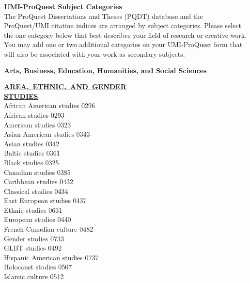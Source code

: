 \documentclass[9pt,twoside]{article}
\newcommand{\categoryheading}[1]{{\fontsize{8}{11}\selectfont \textbf{\uline{#1}}}}
\newcommand{\fieldheading}[1]{{\large \textbf{#1}}}
\begin{document}
\clearpage
{}
\raggedcolumns
\setlength{\parskip}{\baselineskip}
\fancyhf{}
\rfoot{\the\numexpr\thepage-1\relax}
{\large\textbf{UMI-ProQuest Subject Categories}} \\
The ProQuest Dissertations and Theses (PQDT) database and the ProQuest/UMI citation indices are arranged by subject categories. Please select
the one category below that best describes your field of research or creative work. You may add one or two additional categories on your UMI-ProQuest
form that will also be associated with your work as secondary subjects.

\fieldheading{Arts, Business, Education, Humanities, and Social Sciences}

\fontsize{8}{10}\selectfont
\setlength\columnsep{.6in}
\raggedright
\begin{multicols}{3}
\categoryheading{AREA,~ETHNIC,~AND~GENDER \\
STUDIES} \leavevmode \\
African American studies \hfill 0296 \leavevmode \\
African studies \hfill 0293 \leavevmode \\
American studies \hfill 0323 \leavevmode \\
Asian American studies \hfill 0343 \leavevmode \\
Asian studies \hfill 0342 \leavevmode \\
Baltic studies \hfill 0361 \leavevmode \\
Black studies \hfill 0325 \leavevmode \\
Canadian studies \hfill 0385 \leavevmode \\
Caribbean studies \hfill 0432 \leavevmode \\
Classical studies \hfill 0434 \leavevmode \\
East European studies \hfill 0437 \leavevmode \\
Ethnic studies \hfill 0631 \leavevmode \\
European studies \hfill 0440 \leavevmode \\
French Canadian culture \hfill 0482 \leavevmode \\
Gender studies \hfill 0733 \leavevmode \\
GLBT studies \hfill 0492 \leavevmode \\
Hispanic American studies \hfill 0737 \leavevmode \\
Holocaust studies \hfill 0507 \leavevmode \\
Islamic culture \hfill 0512 \leavevmode \\

\end{multicols}
\end{document}
